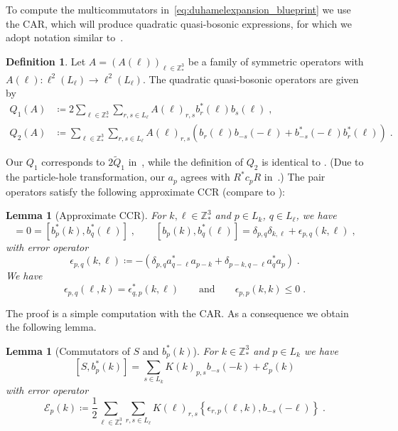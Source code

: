 \documentclass[12pt,a4paper]{article}
\numberwithin{equation}{section}
\newcommand{\1}{\mathbb{I}}
\newcommand{\Z}{\mathbb{Z}}
\theoremstyle{plain}
\newtheorem{lemma}[theorem]{Lemma}
\theoremstyle{definition}
\newtheorem{definition}[theorem]{Definition}
\theoremstyle{remark}
\theoremstyle{plain}
\theoremstyle{definition}
\theoremstyle{remark}
\begin{document}
To compute the multicommutators in~\eqref{eq:duhamelexpansion_blueprint} we use the CAR, which will produce quadratic quasi-bosonic expressions, for which we adopt notation similar to~\cite{CHN21}.

\begin{definition} \label{def:Q}
Let $A=(A(\ell))_{\ell \in \Z^3_*} $ be a family of symmetric operators with $A(\ell): \ell^2(L_\ell)\rightarrow \ell^2(L_\ell)$. The quadratic quasi-bosonic operators are given by
\begin{equation} \label{eq:Q}
\begin{aligned}
	Q_1(A)&\coloneq 2 \sum_{\ell \in \Z^3_*}\sum_{r,s \in L_{\ell}}A(\ell)_{r,s} b^*_r(\ell)b_{s}(\ell) \;,\\
	Q_2(A)&\coloneq \sum_{\ell \in \Z^3_*}\sum_{r,s \in L_{\ell}}A(\ell)_{r,s} \left(b_r(\ell)b_{-s}(-\ell)+b^*_{-s}(-\ell)b^*_{r}(\ell)\right) \;.
\end{aligned}
\end{equation} 
\end{definition}
Our $ Q_1 $ corresponds to $ 2 \tilde Q_1 $ in~\cite{CHN21}, while the definition of $ Q_2 $ is identical to \cite{CHN21}. (Due to the particle-hole transformation, our $ a_p $ agrees with $ R^* c_p R $ in~\cite{CHN21,CHN23,CHN24}.) The pair operators satisfy the following approximate CCR (compare to \cite[(1.66)]{CHN21}):

\begin{lemma}[Approximate CCR]\label{lem:paircomm}
For $k,\ell \in \Z^3_*$ and $p \in L_{k}$, $q\in L_{\ell}$, we have
\begin{equation}
	[b_{p}(k),b_{q}(\ell)]
	= 0 = [b^*_{p}(k),b^*_{q}(\ell)]  \;, \qquad
	[b_{p}(k),b^*_{q}(\ell)]
	= \delta_{p,q}\delta_{k,\ell} + \epsilon_{p,q}(k,\ell) \;,
\end{equation}
 with error operator
\begin{equation}
	\epsilon_{p,q}(k,\ell)
	\coloneq -\left(\delta_{p,q}a^*_{q-\ell}a_{p-k} + \delta_{p-k,q-\ell}a^*_{q}a_{p}\right) \;.
\end{equation}
We have
\begin{equation}
\epsilon_{p,q}(\ell,k) = \epsilon^*_{q,p}(k,\ell) \qquad \text{and} \qquad \epsilon_{p,p}(k,k)\leq 0 \;.
\end{equation}
\end{lemma}
The proof is a simple computation with the CAR. As a consequence we obtain the following lemma.

\begin{lemma}[Commutators of $S $ and $b^*_p(k)$]
For $k \in \Z^3_*$ and $p \in L_k$ we have
\begin{equation} \label{eq:comm_Kb}
	[S, b^*_p(k)]
	= \sum_{s\in L_{k}}K(k)_{p,s}b_{-s}(-k)
		+ \mathcal{E}_{p}(k)
\end{equation}
with error operator
\begin{equation}\label{eq:commerrKb}
	\mathcal{E}_{p}(k)
	\coloneq \frac{1}{2}\sum_{\ell\in \mathbb{Z}^3_*}\sum_{r,s\in L_\ell}K(\ell)_{r,s}\left\{\epsilon_{r,p}(\ell,k),b_{-s}(-\ell)\right\} \;.
\end{equation}
\end{lemma}
\end{document}
